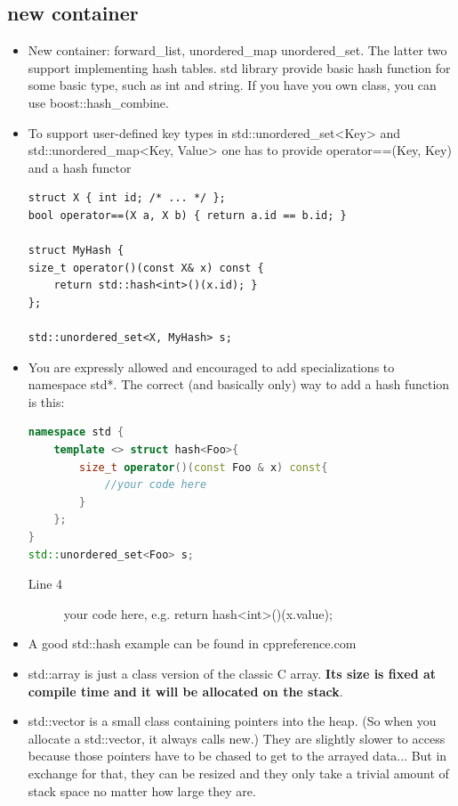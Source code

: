 \documentclass[a4paper,11pt,twoside]{book}
\begin{document}
\subsection{new container}
\begin{itemize}

\item New container: forward\_list, unordered\_map unordered\_set.  The latter two support implementing hash tables. std library provide basic hash function for some basic type, such as int and string. If you have you own class, you can use boost::hash\_combine. 

\item To support user-defined key types in std::unordered\_set<Key> and std::unordered\_map<Key, Value> one has to provide operator==(Key, Key) and a hash functor
\begin{lstlisting}[numbers=none]
struct X { int id; /* ... */ };
bool operator==(X a, X b) { return a.id == b.id; }

struct MyHash {
size_t operator()(const X& x) const { 
	return std::hash<int>()(x.id); }
};

std::unordered_set<X, MyHash> s;
\end{lstlisting}

\item You are expressly allowed and encouraged to add specializations to namespace std*. The correct (and basically only) way to add a hash function is this:
\begin{lstlisting}[frame=single, language=c++]
namespace std {
	template <> struct hash<Foo>{
		size_t operator()(const Foo & x) const{
			//your code here
		}
	};
}
std::unordered_set<Foo> s;
\end{lstlisting}
\begin{description}
	\item[Line 4] your code here, e.g. return hash<int>()(x.value);
\end{description}
\item A good std::hash example can be found in cppreference.com 

\item std::array is just a class version of the classic C array. \textbf{Its size is fixed at compile time and it will be allocated  on the stack}.

\item std::vector is a small class containing pointers into the heap. (So when you allocate a std::vector, it always calls new.) They are slightly slower to access because those pointers have to be chased to get to the arrayed data... But in exchange for that, they can be resized and they only take a trivial amount of stack space no matter how large they are.



\end{itemize}
\end{document}
